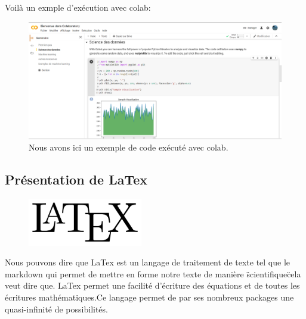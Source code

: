 Voilà un exmple d'exécution avec colab:

\begin{figure}[h]
\begin{center}
\includegraphics[width=15cm]{./images/Cap_colab.PNG}
\caption{Nous avons ici un exemple de code exécuté avec colab.}
\end{center}
\end{figure}


\hypertarget{Pruxe9sentation-de-LaTex}{%
\subsection{Présentation de LaTex}
\label{Pruxe9sentation-de-LaTex}}

\begin{figure}[h]
  \begin{center}
\includegraphics[width=5cm]{./images/Latex.png}
\end{center}
\end{figure}

Nous pouvons dire que LaTex est un langage de traitement de texte tel que le markdown qui permet de mettre en forme notre texte de manière \"scientifique\" cela veut dire que. LaTex permet une facilité d'écriture des équations et de toutes les écritures mathématiques.Ce langage permet de par ses nombreux packages une quasi-infinité de possibilités.
